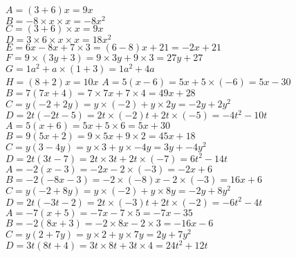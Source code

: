 \documentclass[a4paper,11pt,fleqn]{article}		%
\begin{document}
\begin{correction}
\begin{multicols}{2}
$A=(3  +6) x=9 x$\\
$B=-8 \times x\times x=-8 x^2$\\
$C=(3 +6) \times x=9  x$\\
$D=3\times 6\times x\times x=18 x^2$\\
$E= 6  x -8 x +7\times 3 = (6  -8) x +21 = -2 x +21 $\\
$F=9 \times (3y +3)  =9 \times 3y +9 \times 3
 =27y +27 $\\
$G=1 a^2+a\times (1+ 3)=1 a^2+4a$\\
$H= (8 +2)x = 10x$
$A=  5 (x  -6)=  5 x +5 \times (-6)=  5 x -30$\\
$B= 7 ( 7 x    +4)= 7 \times 7 x  +7 \times  4= 49 x  +28$\\
$C=y( -2  +2 y)=y \times (-2) + y \times 2 y=-2 y + 2 y^2$\\
$D= 2  t(  -2 t -5)= 2  t \times (-2) t +2  t \times (-5) = -4  t^2  -10  t  $
$A=  5 (x  +6)=  5 x +5 \times 6=  5 x +30$\\
$B= 9 ( 5 x    +2)= 9 \times 5 x  +9 \times  2= 45 x  +18$\\
$C=y( 3  -4 y)=y \times 3 + y \times -4 y=3 y + -4 y^2$\\
$D= 2  t(  3 t -7)= 2  t \times 3 t +2  t \times (-7) = 6  t^2  -14  t  $
$A=  -2 (x  -3)=  -2 x -2 \times (-3)=  -2 x +6$\\
$B= -2 ( -8 x    -3)= -2 \times (-8) x  -2 \times  (-3)= 16 x  +6$\\
$C=y( -2  +8 y)=y \times (-2) + y \times 8 y=-2 y + 8 y^2$\\
$D= 2  t(  -3 t -2)= 2  t \times (-3) t +2  t \times (-2) = -6  t^2  -4  t  $
$A=  -7 (x  +5)=  -7 x -7 \times 5=  -7 x -35$\\
$B= -2 ( 8 x    +3)= -2 \times 8 x  -2 \times  3= -16 x  -6$\\
$C=y( 2  +7 y)=y \times 2 + y \times 7 y=2 y + 7 y^2$\\
$D= 3  t(  8 t +4)= 3  t \times 8 t +3  t \times 4 = 24  t^2  +12  t  $


\end{multicols}
\end{correction}
\end{document}
